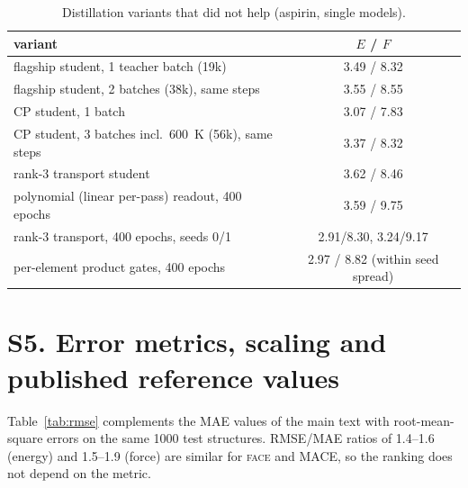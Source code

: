\documentclass[journal=jctcce,manuscript=suppinfo,layout=traditional]{achemso}
\newcommand{\FACE}{\textsc{face}}
\begin{document}
\begin{table}[h]
\caption{Distillation variants that did not help (aspirin, single models).}
\label{tab:distillneg}
\begin{tabular}{lc}
\toprule
variant & $E$ / $F$ \\
\midrule
flagship student, 1 teacher batch (19k) & 3.49 / 8.32 \\
flagship student, 2 batches (38k), same steps & 3.55 / 8.55 \\
CP student, 1 batch & 3.07 / 7.83 \\
CP student, 3 batches incl.\ 600~K (56k), same steps & 3.37 / 8.32 \\
rank-3 transport student & 3.62 / 8.46 \\
polynomial (linear per-pass) readout, 400 epochs & 3.59 / 9.75 \\
rank-3 transport, 400 epochs, seeds 0/1 & 2.91/8.30, 3.24/9.17 \\
per-element product gates, 400 epochs & 2.97 / 8.82 (within seed spread) \\
\bottomrule
\end{tabular}
\end{table}

\section*{S5. Error metrics, scaling and published reference values}
Table~\ref{tab:rmse} complements the MAE values of the main text with root-mean-square errors on the same 1000 test
structures. RMSE/MAE ratios of 1.4--1.6 (energy) and 1.5--1.9 (force) are similar for \FACE{} and MACE, so the
ranking does not depend on the metric.
\end{document}
